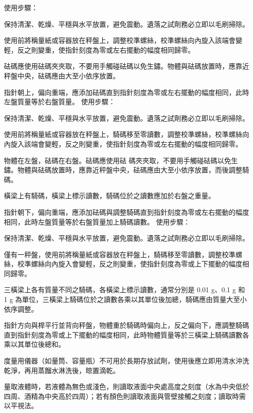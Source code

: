 \documentclass[a4paper,12pt]{article}
\begin{document}
\een
{}
使用步驟：
\ben
\item 保持清潔、乾燥、平穩與水平放置，避免震動。遺落之試劑務必立即以毛刷掃除。
\item 使用前將稱量紙或容器放在秤盤上，調整校準螺絲，校準螺絲向內旋入該端會變輕，反之則變重，使指針刻度為零或左右擺動的幅度相同歸零。
\item 砝碼應使用砝碼夾夾取，不要用手觸碰砝碼以免生鏽。物體與砝碼放置時，應靠近秤盤中央，砝碼應由大至小依序放置。
\item 指針朝上，偏向重端，應添加砝碼直到指針刻度為零或左右擺動的幅度相同，此時左盤質量等於右盤質量。
\een
{}
使用步驟：
\ben
\item 保持清潔、乾燥、平穩與水平放置，避免震動。遺落之試劑務必立即以毛刷掃除。
\item 使用前將稱量紙或容器放在秤盤上，騎碼移至零讀數，調整校準螺絲，校準螺絲向內旋入該端會變輕，反之則變重，使指針刻度為零或左右擺動的幅度相同歸零。
\item 物體在左盤，砝碼在右盤。砝碼應使用砝
碼夾夾取，不要用手觸碰砝碼以免生鏽。物體與砝碼放置時，應靠近秤盤中央，砝碼應由大至小依序放置，而後調整騎碼。
\item 橫梁上有騎碼，橫梁上標示讀數，騎碼位於之讀數應加於右盤之重量。
\item 指針朝下，偏向重端，應添加砝碼與調整騎碼直到指針刻度為零或左右擺動的幅度相同，此時左盤質量等於右盤質量加上騎碼讀數。
\een
{}
使用步驟：
\ben
\item 保持清潔、乾燥、平穩與水平放置，避免震動。遺落之試劑務必立即以毛刷掃除。
\item 僅有一秤盤，使用前將稱量紙或容器放在秤盤上，騎碼移至零讀數，調整校準螺絲，校準螺絲向內旋入會變輕，反之則變重，使指針刻度為零或上下擺動的幅度相同歸零。
\item 三橫梁上各有質量不同之騎碼，各橫梁上標示讀數，通常分別是 0.01 g、0.1 g 和 1 g 為單位，三橫梁上騎碼位於之讀數各乘以其單位後加總，騎碼應由質量大至小依序調整。
\item 指針方向與桿平行並背向秤盤，物體重於騎碼時偏向上，反之偏向下，應調整騎碼直到指針刻度為零或上下擺動的幅度相同，此時物體質量等於三橫梁上騎碼讀數各乘以其單位後總和。
\een
{}
\bit
\item 度量用儀器（如量筒、容量瓶）不可用於長期存放試劑，使用後應立即用清水沖洗乾淨，再用蒸餾水淋洗後，晾置滴乾。
\item 量取液體時，若液體為無色或淺色，則讀取液面中央處高度之刻度（水為中央低於四周、酒精為中央高於四周）；若有顏色則讀取液面與管壁接觸之刻度；讀取時需以平視法。
\end{document}
